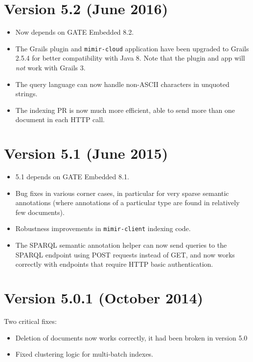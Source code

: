 \section{Version 5.2 (June 2016)}
\begin{itemize}
\item Now depends on GATE Embedded 8.2.
\item The Grails plugin and \verb!mimir-cloud! application have been upgraded
  to Grails 2.5.4 for better compatibility with Java 8.  Note that the plugin
  and app will \emph{not} work with Grails 3.
\item The query language can now handle non-ASCII characters in unquoted
  strings.
\item The \Mimir{} indexing PR is now much more efficient, able to send more
  than one document in each HTTP call.
\end{itemize}

\section{Version 5.1 (June 2015)}
\begin{itemize}
\item \Mimir{} 5.1 depends on GATE Embedded 8.1.
\item Bug fixes in various corner cases, in particular for very sparse semantic
  annotations (where annotations of a particular type are found in relatively
  few documents).
\item Robustness improvements in \verb!mimir-client! indexing code.
\item The SPARQL semantic annotation helper can now send queries to the SPARQL
  endpoint using POST requests instead of GET, and now works correctly with
  endpoints that require HTTP basic authentication.
\end{itemize}

\section{Version 5.0.1 (October 2014)}
Two critical fixes:
\begin{itemize}
  \item Deletion of documents now works correctly, it had been broken in
  version 5.0
  \item Fixed clustering logic for multi-batch indexes.
\end{itemize}

